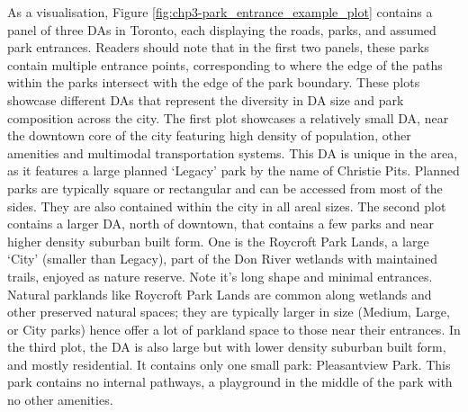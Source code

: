 \documentclass[
11pt, %
oneside, %
english, %
singlespacing, %
]{macthesis} %
\begin{document}
As a visualisation, Figure \ref{fig:chp3-park_entrance_example_plot} contains a panel of three DAs in Toronto, each displaying the roads, parks, and assumed park entrances. Readers should note that in the first two panels, these parks contain multiple entrance points, corresponding to where the edge of the paths within the parks intersect with the edge of the park boundary. These plots showcase different DAs that represent the diversity in DA size and park composition across the city. The first plot showcases a relatively small DA, near the downtown core of the city featuring high density of population, other amenities and multimodal transportation systems. This DA is unique in the area, as it features a large planned `Legacy' park by the name of Christie Pits. Planned parks are typically square or rectangular and can be accessed from most of the sides. They are also contained within the city in all areal sizes. The second plot contains a larger DA, north of downtown, that contains a few parks and near higher density suburban built form. One is the Roycroft Park Lands, a large `City' (smaller than Legacy), part of the Don River wetlands with maintained trails, enjoyed as nature reserve. Note it's long shape and minimal entrances. Natural parklands like Roycroft Park Lands are common along wetlands and other preserved natural spaces; they are typically larger in size (Medium, Large, or City parks) hence offer a lot of parkland space to those near their entrances. In the third plot, the DA is also large but with lower density suburban built form, and mostly residential. It contains only one small park: Pleasantview Park. This park contains no internal pathways, a playground in the middle of the park with no other amenities.
\end{document}
